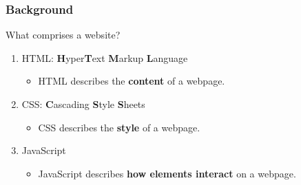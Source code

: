 \begin{frame}
    \frametitle{Background}

    What comprises a website?
    \bigskip

    \begin{enumerate}[<+->]
        \setlength\itemsep{2em}
        \item HTML: \textbf{H}yper\textbf{T}ext \textbf{M}arkup \textbf{L}anguage
        \begin{itemize}
            \item HTML describes the \textbf{content} of a webpage.
        \end{itemize}
        \item CSS: \textbf{C}ascading \textbf{S}tyle \textbf{S}heets
        \begin{itemize}
            \item CSS describes the \textbf{style} of a webpage.
        \end{itemize}
        \item JavaScript
        \begin{itemize}
            \item JavaScript describes \textbf{how elements interact} on a webpage.
        \end{itemize}
    \end{enumerate}

    \bigskip
\end{frame}